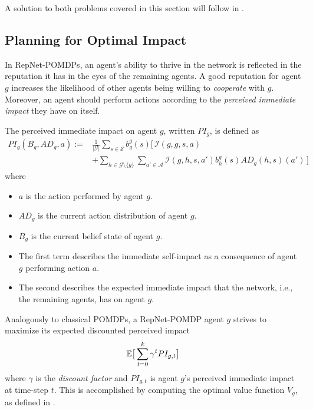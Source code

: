 A solution to both problems covered in this section will follow in .












\subsection{Planning for Optimal Impact}
In RepNet-POMDPs, an agent's ability to thrive in the network is reflected in the reputation it has in the eyes of the remaining agents. A good reputation for agent $g$ increases the likelihood of other agents being willing to \textit{cooperate} with $g$. Moreover, an agent should perform actions according to the \textit{perceived immediate impact} they have on itself.
\begin{definition}
\label{def:perceivedpo}
The perceived immediate impact on agent $g$, written $PI_g$, is defined as
    \begin{align*}
        PI_g(B_g,AD_g, a) := &\frac{1}{|\mathcal{G}|} \sum_{s \in \mathcal{S}} b_g^g(s) \big[ \, \mathcal{I}(g,g,s,a) \\&+ \sum_{h \in \mathcal{G} \setminus \{ g \}}  \sum_{a' \in \mathcal{A}} \mathcal{I}(g, h, s, a') b_h^g(s) AD_g(h, s)(a') \, \big]
    \end{align*}
    where
    \begin{itemize}
        \item $a$ is the action performed by agent $g$.
        \item $AD_g$ is the current action distribution of agent $g$.
        \item $B_g$ is the current belief state of agent $g$.
        \item The first term describes the immediate self-impact as a consequence of agent $g$ performing action $a$.
        \item The second describes the expected immediate impact that the network, i.e., the remaining agents, has on agent $g$.
    \end{itemize}
\end{definition}


Analogously to classical POMDPs, a RepNet-POMDP agent $g$ strives to maximize its expected discounted perceived impact
\begin{align}
    \mathbb{E} \big[ \sum_{t = 0}^{k} \gamma^t PI_{g,t}\big]
\end{align}
where $\gamma$ is the \textit{discount factor} and $PI_{g,t}$ is agent $g$'s perceived immediate impact at time-step $t$. This is accomplished by computing the optimal value function $V_g$, as defined in .

